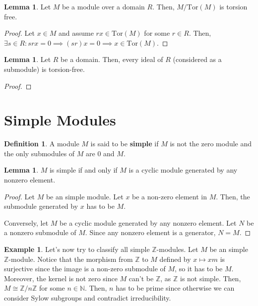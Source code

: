 \documentclass{article}
\theoremstyle{definition}
\newtheorem{definition}{Definition}
\newtheorem{lemma}[theorem]{Lemma}
\newtheorem{example}[theorem]{Example}
\newcommand{\N}{\mathbb{N}}
\newcommand{\Z}{\mathbb{Z}}
\newcommand{\Tor}{\text{Tor}}
\begin{document}
\begin{lemma}
    Let $M$ be a module over a domain $R$. Then, $M/\Tor(M)$ is torsion free.
\end{lemma}
\begin{proof}
    Let $x \in M$ and assume $rx \in \Tor(M)$ for some $r \in R$. Then,
    $\exists s \in R: srx = 0 \implies (sr)x = 0 \implies x \in \Tor(M)$.
\end{proof}

\begin{lemma}
    Let $R$ be a domain. Then, every ideal of $R$ (considered as a submodule)
    is torsion-free.
\end{lemma}
\begin{proof}
    
\end{proof}

\newpage

\section{Simple Modules}

\begin{definition}
    A module $M$ is said to be \textbf{simple} if $M$ is not the zero module and the only submodules of $M$ are $0$ and $M$.
\end{definition}

\begin{lemma}\label{M_cyclic_iff_any_nonzero_element_generates}
    $M$ is simple if and only if $M$ is a cyclic module generated by any nonzero element.
\end{lemma}
\begin{proof}
    Let $M$ be an simple module. Let $x$ be a non-zero element in $M$. Then, the submodule generated by $x$ has to be $M$.

    Conversely, let $M$ be a cyclic module generated by any nonzero element. Let $N$ be a nonzero submodule of $M$. Since any nonzero element is a generator, $N = M$. 
\end{proof}

\begin{example}
    Let's now try to classify all simple $\Z$-modules. Let $M$ be an simple $\Z$-module.
    Notice that the morphism from $\Z$ to $M$ defined by $x \mapsto xm$ is surjective since the image is a non-zero submodule of $M$, so it has to be $M$.
    Moreover, the kernel is not zero since $M$ can't be $\Z$, as $\Z$ is not simple. Then, $M \cong \Z/n\Z$ for some $n \in \N$.
    Then, $n$ has to be prime since otherwise we can consider Sylow subgroups and contradict irreducibility.
\end{example}
\end{document}
